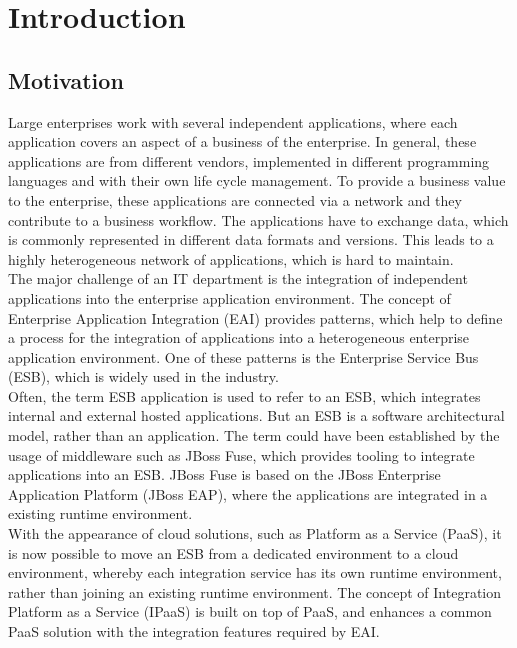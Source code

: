 \chapter{Introduction}
\label{cha:intro}

\section{Motivation}
\label{sec:intro-motivation}
Large enterprises work with several independent applications, where each application covers an aspect of a business of the enterprise. In general, these applications are from different vendors, implemented in different programming languages and with their own life cycle management. To provide a business value to the enterprise, these applications are connected via a network and they contribute to a business workflow. The applications have to exchange data, which is commonly represented in different data formats and versions. This leads to a highly heterogeneous network of applications, which is hard to maintain. \\

The major challenge of an IT department is the integration of independent applications into the enterprise application environment. The concept of Enterprise Application Integration (EAI) provides patterns, which help to define a process for the integration of applications into a heterogeneous enterprise application environment. One of these patterns is the Enterprise Service Bus (ESB), which is widely used in the industry\cite{EIP}. \\

Often, the term ESB application is used to refer to an ESB, which integrates internal and external hosted applications. But an ESB is a software architectural model, rather than an application. The term could have been established by the usage of middleware such as JBoss Fuse, which provides tooling to integrate applications into an ESB. JBoss Fuse is based on the JBoss Enterprise Application Platform (JBoss EAP), where the applications are integrated in a existing runtime environment\cite{Fuse2018}. \\

With the appearance of cloud solutions, such as Platform as a Service (PaaS), it is now possible to move an ESB from a dedicated environment to a cloud environment, whereby each integration service has its own runtime environment, rather than joining an existing runtime environment. The concept of Integration Platform as a Service (IPaaS) is built on top of PaaS, and enhances a common PaaS solution with the integration features required by EAI\cite{PaaS2015, iPaaSP12015}.

